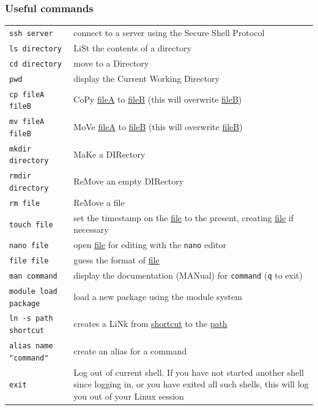 \documentclass[hyperref,pdfa,unicode,utf8,usepdftitle]{beamer}
\begin{document}
\begin{frame}
  \frametitle{Useful commands}
  \begin{center}
    \footnotesize
    \begin{tabular}{l>{\RaggedRight\arraybackslash\noindent}p{7cm}}
      \toprule
      \lstinline{ssh server} & connect to a server using the Secure Shell Protocol \\
      \lstinline{ls directory} & LiSt the contents of a directory \\
      \lstinline{cd directory} & move to a Directory \\
      \lstinline{pwd} & display the Current Working Directory \\
      \lstinline{cp fileA fileB} & CoPy \url{fileA} to \url{fileB} (this will overwrite \url{fileB}) \\
      \lstinline{mv fileA fileB} & MoVe \url{fileA} to \url{fileB} (this will overwrite \url{fileB}) \\
      \lstinline{mkdir directory} & MaKe a DIRectory \\
      \lstinline{rmdir directory} & ReMove an empty DIRectory \\
      \lstinline{rm file} & ReMove a file \\
      \lstinline{touch file} & set the timestamp on the \url{file} to the present, creating \url{file} if necessary \\
      \lstinline{nano file} & open \url{file} for editing with the \lstinline{nano} editor \\
      \lstinline{file file} & guess the format of \url{file} \\
      \lstinline{man command} & display the documentation (MANual) for \lstinline{command} (\texttt{q} to exit) \\
      \lstinline{module load package} & load a new package using the module system \\
      \lstinline{ln -s path shortcut} & creates a LiNk from \url{shortcut} to the \url{path} \\
      \lstinline{alias name "command"} & create an alias for a command \\
      \lstinline{exit} & Log out of current shell.  If you have not started another shell since logging in, or you have exited all such shells, this will log you out of your Linux session \\
      \bottomrule
    \end{tabular}
  \end{center}
\end{frame}
\end{document}
